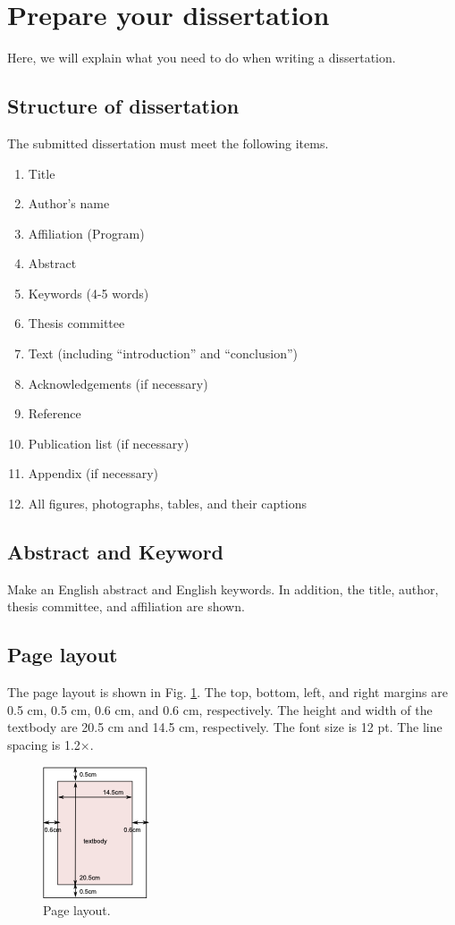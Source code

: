 \section{Prepare your dissertation}
Here, we will explain what you need to do when writing a dissertation.

\subsection{Structure of dissertation}
The submitted dissertation must meet the following items.

\begin{enumerate}
    \item Title
    \item Author's name
    \item Affiliation (Program)
    \item Abstract
    \item Keywords (4-5 words)
    \item Thesis committee
    \item Text (including ``introduction'' and ``conclusion'')
    \item Acknowledgements (if necessary)
    \item Reference
    \item Publication list (if necessary)
    \item Appendix (if necessary)
    \item All figures, photographs, tables, and their captions
\end{enumerate}

\subsection{Abstract and Keyword}

Make an English abstract and English keywords. In addition, the title, author, thesis committee, and aﬃliation are shown.

\subsection{Page layout}
The page layout is shown in Fig. \ref{fig:layout}.
The top, bottom, left, and right margins are
0.5 cm, 0.5 cm, 0.6 cm, and 0.6 cm, respectively.
The height and width of the textbody are 20.5 cm and 14.5 cm, respectively.
The font size is 12 pt. The line spacing is 1.2×.

\begin{figure}[t]
    \centering
    \includegraphics{src/Picture1.png}
    \caption{Page layout.}
    \label{fig:layout}
\end{figure}

